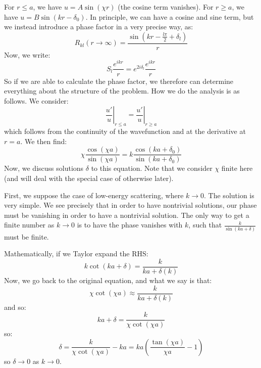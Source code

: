 For $r \leq a$, we have $u = A\sin(\chi r)$ (the cosine term vanishes). For $r \geq a$, we have $u = B\sin(kr - \delta_0)$. In principle, we can have a cosine and sine term, but we instead introduce a phase factor in a very precise way, as:
\begin{equation}
    R_{kl}(r \to \infty) = \frac{\sin(kr - \frac{l\pi}{2} + \delta_l)}{r}
\end{equation}
Now, we write:
\begin{equation}
    S_l \frac{e^{ikr}}{r} = e^{2i\delta_l}\frac{e^{ikr}}{r}
\end{equation}
So if we are able to calculate the phase factor, we therefore can determine everything about the structure of the problem. How we do the analysis is as follows. We consider:
\begin{equation}
    \left. \frac{u'}{u}\right|_{r \leq a} = \left. \frac{u'}{u}\right|_{r \geq a}
\end{equation}
which follows from the continuity of the wavefunction and at the derivative at $r = a$. We then find:
\begin{equation}
    \chi \frac{\cos(\chi a)}{\sin(\chi a)} = k\frac{\cos(ka + \delta_0)}{\sin(ka + \delta_0)}
\end{equation}
Now, we discuss solutions $\delta$ to this equation. Note that we consider $\chi$ finite here (and will deal with the special case of otherwise later).

First, we suppose the case of low-energy scattering, where $k \to 0$. The solution is very simple. We see precisely that in order to have nontrivial solutions, our phase must be vanishing in order to have a nontrivial solution. The only way to get a finite number as $k \to 0$ is to have the phase vanishes with $k$, such that $\frac{k}{\sin(ka + \delta)}$ must be finite.


Mathematically, if we Taylor expand the RHS:
\begin{equation}
    k\cot(ka + \delta) = \frac{k}{ka + \delta(k)}
\end{equation}
Now, we go back to the original equation, and what we say is that:
\begin{equation}
    \chi\cot(\chi a) \approx \frac{k}{ka + \delta(k)}
\end{equation}
and so:
\begin{equation}
    ka + \delta = \frac{k}{\chi\cot(\chi a)}
\end{equation}
so:
\begin{equation}
    \delta = \frac{k}{\chi\cot(\chi a)} - ka = ka\left(\frac{\tan(\chi a)}{\chi a} - 1\right)
\end{equation}
so $\delta \to 0$ as $k \to 0$. 

